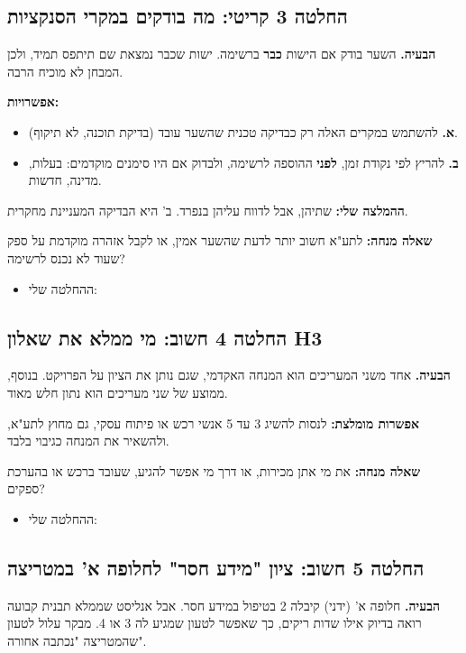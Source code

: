 \documentclass[11pt,a4paper]{article}
\newcommand{\en}[1]{\foreignlanguage{english}{#1}}
\newcommand{\cb}{\framebox[1.7ex]{\rule{0pt}{1.3ex}}}
\newenvironment{checks}{\begin{itemize}\renewcommand{\labelitemi}{\cb}}{\end{itemize}}
\newcommand{\crit}{\textcolor{red!70!black}{\textbf{קריטי}}}
\newcommand{\imp}{\textcolor{orange!80!black}{\textbf{חשוב}}}
\begin{document}
\subsection*{החלטה 3 \crit: מה בודקים במקרי הסנקציות}
\textbf{הבעיה.} השער בודק אם הישות \textbf{כבר} ברשימה. ישות שכבר נמצאת שם תיתפס תמיד, ולכן המבחן לא מוכיח הרבה.

\textbf{אפשרויות:}
\begin{itemize}
\item \textbf{א.} להשתמש במקרים האלה רק כבדיקה טכנית שהשער עובד (בדיקת תוכנה, לא תיקוף).
\item \textbf{ב.} להריץ לפי נקודת זמן, \textbf{לפני} ההוספה לרשימה, ולבדוק אם היו סימנים מוקדמים: בעלות, מדינה, חדשות.
\end{itemize}
\textbf{ההמלצה שלי:} שתיהן, אבל לדווח עליהן בנפרד. ב' היא הבדיקה המעניינת מחקרית.

\textbf{שאלה מנחה:} לתע"א חשוב יותר לדעת שהשער אמין, או לקבל אזהרה מוקדמת על ספק שעוד לא נכנס לרשימה?

\begin{checks}
\item ההחלטה שלי: \underline{\hspace{8cm}}
\end{checks}

\subsection*{החלטה 4 \imp: מי ממלא את שאלון \en{H3}}
\textbf{הבעיה.} אחד משני המעריכים הוא המנחה האקדמי, שגם נותן את הציון על הפרויקט. בנוסף, ממוצע של שני מעריכים הוא נתון חלש מאוד.

\textbf{אפשרות מומלצת:} לנסות להשיג 3 עד 5 אנשי רכש או פיתוח עסקי, גם מחוץ לתע"א, ולהשאיר את המנחה כגיבוי בלבד.

\textbf{שאלה מנחה:} את מי אתן מכירות, או דרך מי אפשר להגיע, שעובד ברכש או בהערכת ספקים?

\begin{checks}
\item ההחלטה שלי: \underline{\hspace{8cm}}
\end{checks}

\subsection*{החלטה 5 \imp: ציון "מידע חסר" לחלופה א' במטריצה}
\textbf{הבעיה.} חלופה א' (ידני) קיבלה 2 בטיפול במידע חסר. אבל אנליסט שממלא תבנית קבועה רואה בדיוק אילו שדות ריקים, כך שאפשר לטעון שמגיע לה 3 או 4. מבקר עלול לטעון שהמטריצה "נכתבה אחורה".
\end{document}
